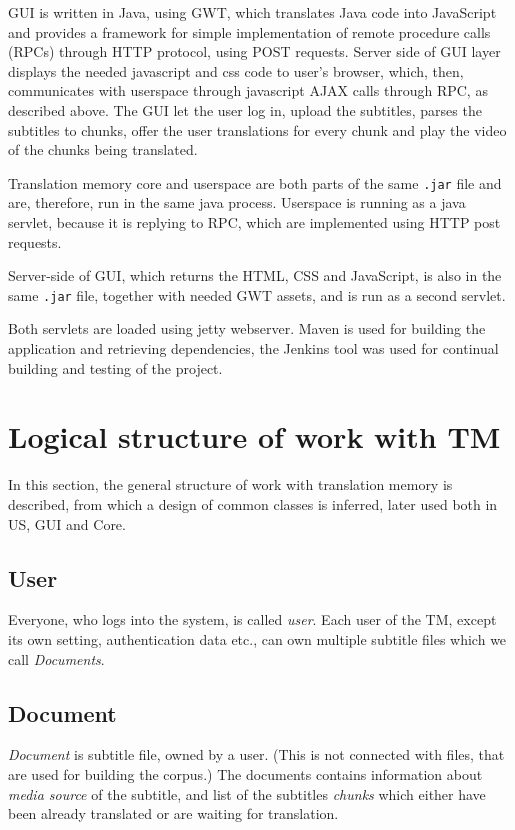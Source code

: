 GUI is written in Java, using GWT, which translates Java code into JavaScript and provides a framework for simple implementation of remote procedure calls (RPCs) through HTTP protocol, using POST requests. Server side of GUI layer displays the needed javascript and css code to user's browser, which, then, communicates with userspace through javascript AJAX calls through RPC, as described above. The GUI let the user log in, upload the subtitles, parses the subtitles to chunks, offer the user translations for every chunk and play the video of the chunks being translated.

Translation memory core and userspace are both parts of the same \texttt{.jar} file and are, therefore, run in the same java process. Userspace is running as a java servlet, because it is replying to RPC, which are implemented using HTTP post requests.

Server-side of GUI, which returns the HTML, CSS and JavaScript, is also in the same \texttt{.jar} file, together with needed GWT assets, and is run as a second servlet.

Both servlets are loaded using jetty webserver. Maven is used for building the application and retrieving dependencies, the Jenkins tool was used for continual building and testing of the project.

\section{Logical structure of work with TM}

In this section, the general structure of work with translation memory is described, from which a design of common classes is inferred, later used both in US, GUI and Core.

\subsection*{User}
Everyone, who logs into the system, is called \emph{user}. Each user of the TM, except its own setting, authentication data etc., can own multiple subtitle files which we call \emph{Documents}.

\subsection*{Document}
\emph{Document} is subtitle file, owned by a user. (This is not connected with files, that are used for building the corpus.) The documents contains information about \emph{media source} of the subtitle, and list of the subtitles \emph{chunks} which either have been already translated or are waiting for translation.

